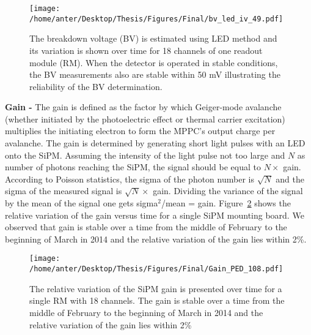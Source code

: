 \begin{figure}[!h]
\begin{center}
\hspace*{-5mm}
\texttt{[image: /home/anter/Desktop/Thesis/Figures/Final/bv\_led\_iv\_49.pdf]}\\
\vspace*{4mm}
\caption[The breakdown voltage (BV) is estimated using LED method and its variation is shown over time for 18 channels of one readout module (RM).]{The breakdown voltage (BV) is estimated using LED method and its variation is shown over time for 18 channels of one readout module (RM). When the detector is operated in stable conditions, the BV measurements also are stable within 50 mV illustrating the reliability of the BV determination.}
\label{fig:BV}
\end{center}
\end{figure} \newline
{\bf Gain -} The gain is defined as the factor by which Geiger-mode avalanche (whether initiated by the photoelectric effect or thermal 
carrier excitation) multiplies the initiating electron to form the MPPC’s output charge per avalanche. The gain is determined by generating short light pulses with an LED onto the SiPM. Assuming the intensity of the light pulse not too large and $N$ as number of photons reaching the SiPM, the signal should be equal to $N \times$ gain. According to Poisson statistics, the sigma of the photon number is $\sqrt{N}$ and the sigma of the measured signal is $\sqrt{N} \times$ gain. Dividing the variance of the signal by the mean of the signal one gets sigma$^2$/mean = gain. Figure~\ref{fig:gain1} shows the relative variation of the gain versus time for a single SiPM mounting board. We observed that gain is stable over a time from the middle of February to the beginning of March in 2014 and the relative variation of the gain lies within 2\%. 
\begin{figure}[!h]
\begin{center}
\vspace{-2mm}
\texttt{[image: /home/anter/Desktop/Thesis/Figures/Final/Gain\_PED\_108.pdf]}
\vspace*{4mm}
\caption{The relative variation of the SiPM gain is presented over time for a single RM with 18 channels. The gain is stable over a time from the middle of February to the beginning of March in 2014 and the relative variation of the gain lies within 2\%}
\label{fig:gain1}
\end{center}
\end{figure}\newline
